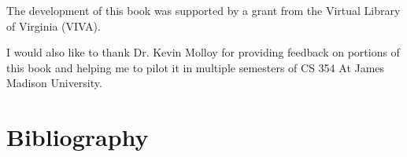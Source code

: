 \documentclass[11pt,fleqn]{book} %
\begin{document}
The development of this book was supported by a grant from the Virtual
Library of Virginia (VIVA).

I would also like to thank Dr. Kevin Molloy for providing feedback on
portions of this book and helping me to pilot it in multiple semesters
of CS 354 At James Madison University.




%


%
%
%


\chapter*{Bibliography}


\printbibliography[heading=bibempty]




\cleardoublepage %
\setlength{\columnsep}{0.75cm} %

\end{document}
